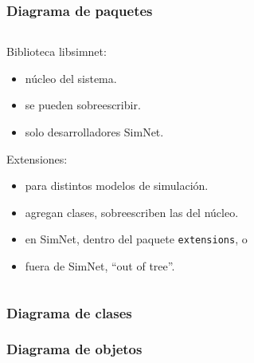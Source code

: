 \documentclass[spanish]{beamer}    %
\begin{document}

\begin{frame}
    \frametitle{Diagrama de paquetes}
    \begin{columns}
    \begin{column}{0.50\textwidth}
        Biblioteca libsimnet:
        \begin{itemize}
            \item núcleo del sistema.
            \item se pueden sobreescribir.
            \item solo desarrolladores SimNet.
        \end{itemize}
        Extensiones:
        \begin{itemize}
            \item para distintos modelos de simulación.
            \item agregan clases, sobreescriben las del núcleo.
            \item en SimNet, dentro del paquete \texttt{extensions}, o
            \item fuera de SimNet, ``out of tree''.
        \end{itemize}
    \end{column}
    \begin{column}{0.50\textwidth}
    \end{column}
    \end{columns}
\end{frame}


\begin{frame}[plain]
    \frametitle{Diagrama de clases}
    \center {}
\end{frame}


\begin{frame}[plain]
    \frametitle{Diagrama de objetos}
    \center {}
\end{frame}

\end{document}
